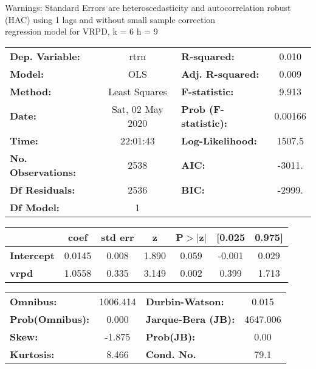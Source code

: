 Warnings: \newline
 [1] Standard Errors are heteroscedasticity and autocorrelation robust (HAC) using 1 lags and without small sample correction\\ 

regression model for VRPD, k = 6 h = 9\begin{center}
\begin{tabular}{lclc}
\toprule
\textbf{Dep. Variable:}    &       rtrn       & \textbf{  R-squared:         } &     0.010   \\
\textbf{Model:}            &       OLS        & \textbf{  Adj. R-squared:    } &     0.009   \\
\textbf{Method:}           &  Least Squares   & \textbf{  F-statistic:       } &     9.913   \\
\textbf{Date:}             & Sat, 02 May 2020 & \textbf{  Prob (F-statistic):} &  0.00166    \\
\textbf{Time:}             &     22:01:43     & \textbf{  Log-Likelihood:    } &    1507.5   \\
\textbf{No. Observations:} &        2538      & \textbf{  AIC:               } &    -3011.   \\
\textbf{Df Residuals:}     &        2536      & \textbf{  BIC:               } &    -2999.   \\
\textbf{Df Model:}         &           1      & \textbf{                     } &             \\
\bottomrule
\end{tabular}
\begin{tabular}{lcccccc}
                   & \textbf{coef} & \textbf{std err} & \textbf{z} & \textbf{P$> |$z$|$} & \textbf{[0.025} & \textbf{0.975]}  \\
\midrule
\textbf{Intercept} &       0.0145  &        0.008     &     1.890  &         0.059        &       -0.001    &        0.029     \\
\textbf{vrpd}      &       1.0558  &        0.335     &     3.149  &         0.002        &        0.399    &        1.713     \\
\bottomrule
\end{tabular}
\begin{tabular}{lclc}
\textbf{Omnibus:}       & 1006.414 & \textbf{  Durbin-Watson:     } &    0.015  \\
\textbf{Prob(Omnibus):} &   0.000  & \textbf{  Jarque-Bera (JB):  } & 4647.006  \\
\textbf{Skew:}          &  -1.875  & \textbf{  Prob(JB):          } &     0.00  \\
\textbf{Kurtosis:}      &   8.466  & \textbf{  Cond. No.          } &     79.1  \\
\bottomrule
\end{tabular}
\end{center}

